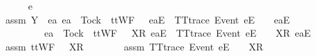 \begin{isabellebody}
\ \ \ \ \isamarkupfalse%
\ e\ {\isasymsigma}{\isacharprime}\isanewline
\ \ \ \ \isamarkupfalse%
\ assm{}{\isacharcolon}\ {\isachardoublequoteopen}Y\ {\isasyminter}\ {\isacharbraceleft}ea{\isachardot}\ ea\ {\isasymnoteq}\ Tock\ {\isasymand}\ ttWF\ {\isacharparenleft}{\isasymsigma}{\isacharprime}\ {\isacharat}\ {\isacharbrackleft}{\isacharbrackleft}ea{\isacharbrackright}\isactrlsub E{\isacharbrackright}{\isacharparenright}\ {\isasymand}\ TT{}{\isacharunderscore}trace\ {\isacharparenleft}{\isacharbrackleft}Event\ e{\isacharbrackright}\isactrlsub E\ {\isacharhash}\ {\isasymsigma}{\isacharprime}\ {\isacharat}\ {\isacharbrackleft}{\isacharbrackleft}ea{\isacharbrackright}\isactrlsub E{\isacharbrackright}{\isacharparenright}\isanewline
\ \ \ \ \ \ \ \ {\isasymor}\ ea\ {\isacharequal}\ Tock\ {\isasymand}\ ttWF\ {\isacharparenleft}{\isasymsigma}{\isacharprime}\ {\isacharat}\ {\isacharbrackleft}{\isacharbrackleft}X{\isacharbrackright}\isactrlsub R{\isacharcomma}\ {\isacharbrackleft}ea{\isacharbrackright}\isactrlsub E{\isacharbrackright}{\isacharparenright}\ {\isasymand}\ TT{}{\isacharunderscore}trace\ {\isacharparenleft}{\isacharbrackleft}Event\ e{\isacharbrackright}\isactrlsub E\ {\isacharhash}\ {\isasymsigma}{\isacharprime}\ {\isacharat}\ {\isacharbrackleft}{\isacharbrackleft}X{\isacharbrackright}\isactrlsub R{\isacharcomma}\ {\isacharbrackleft}ea{\isacharbrackright}\isactrlsub E{\isacharbrackright}{\isacharparenright}{\isacharbraceright}\ {\isacharequal}\ {\isacharbraceleft}{\isacharbraceright}{\isachardoublequoteclose}\isanewline
\ \ \ \ \isamarkupfalse%
\ assm{}{\isacharcolon}\ {\isachardoublequoteopen}ttWF\ {\isacharparenleft}{\isasymsigma}{\isacharprime}\ {\isacharat}\ {\isacharbrackleft}X{\isacharbrackright}\isactrlsub R\ {\isacharhash}\ {\isasymsigma}{\isacharparenright}{\isachardoublequoteclose}\isanewline
\ \ \ \ \isamarkupfalse%
\ assm{}{\isacharcolon}\ {\isachardoublequoteopen}TT{}{\isacharunderscore}trace\ {\isacharparenleft}{\isacharbrackleft}Event\ e{\isacharbrackright}\isactrlsub E\ {\isacharhash}\ {\isasymsigma}{\isacharprime}\ {\isacharat}\ {\isacharbrackleft}X{\isacharbrackright}\isactrlsub R\ {\isacharhash}\ {\isasymsigma}{\isacharparenright}{\isachardoublequoteclose}\isanewline
\ \ \ \ \isamarkupfalse%

\end{isabellebody}
